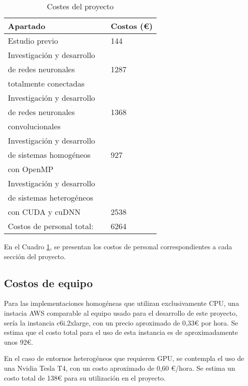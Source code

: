 \begin{table}[H]
	\centering
	\begin{tabular}{|lll|}
		\hline
		Apartado 	 &\vline  & Costos (€) \\
		\hline
		
		Estudio previo    & \vline & 144 \\			
		\hline
		Investigación y desarrollo  	 & \vline & 	\\
		de redes neuronales  	 & \vline & 1287	\\
		totalmente conectadas 	 & \vline & 	\\
		\hline
		Investigación y desarrollo    & \vline & 	 \\	
		de redes neuronales    & \vline & 1368	 \\			
		convolucionales    & \vline & 	 \\					
		\hline
		Investigación y desarrollo  	 & \vline & 	 \\
		de sistemas homogéneos  	 & \vline & 927	 \\
		con OpenMP 	 & \vline & 	 \\
		\hline
		Investigación y desarrollo     & \vline &  	\\
		de sistemas heterogéneos    & \vline &  \\ 
		con CUDA y cuDNN    & \vline & 2538 \\ 	
		\hline
		\hline
		Costos de personal total:				& \vline & 6264 \\
		\hline
	\end{tabular}
	\caption{Costes del proyecto}
	\label{tabla_costes}
\end{table}

En el Cuadro \ref{tabla_costes}, se presentan los costos de personal correspondientes a cada sección del proyecto.

\subsection{Costos de equipo}

Para las implementaciones homogéneas que utilizan exclusivamente CPU, una instacia AWS comparable al equipo usado para el desarrollo de este proyecto, sería la instancia c6i.2xlarge, con un precio aproximado de 0,33€ por hora. Se estima que el costo total para el uso de esta instancia es de aproximadamente unos 92€.

En el caso de entornos heterogéneos que requieren GPU, se contempla el uso de una Nvidia Tesla T4, con un costo aproximado de 0,60 €/hora. Se estima un costo total de 138€ para su utilización en el proyecto.

